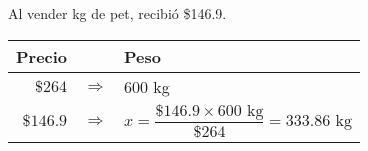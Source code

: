 Al vender \fillin[65][1cm] kg de pet, recibió \$146.9.

\begin{solutionbox}{2.3cm}\scriptsize
    \begin{tabular}{r>{\centering}p{0.2cm}l}
        \textbf{Precio} &               & \textbf{Peso}                                                     \\
        \hline
        $\$264$       & $\Rightarrow$ & $600$ kg                                                            \\
        $\$146.9$     & $\Rightarrow$ & $x=\dfrac{\$146.9  \times 600 \text{ kg}}{\$264}=333.86 \text{ kg}$ \\
    \end{tabular}
\end{solutionbox}